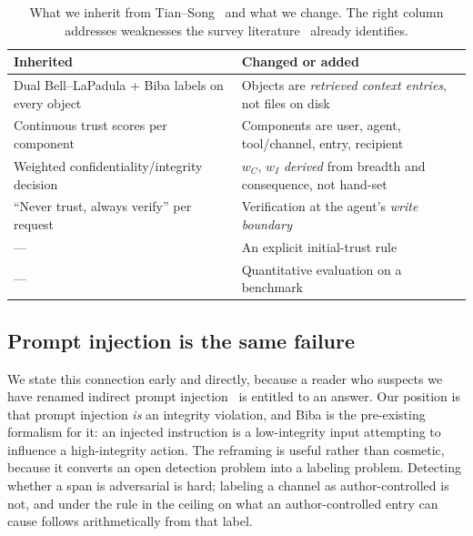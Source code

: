 \documentclass[conference,compsoc]{IEEEtran}
\newcommand{\wC}{\ensuremath{w_C}}
\newcommand{\wI}{\ensuremath{w_I}}
\begin{document}
\begin{table}[t]
\centering
\caption{What we inherit from Tian--Song~\cite{tiansong2021} and what we
change. The right column addresses weaknesses the survey
literature~\cite{he2022zerotrust,sultana2024zerotrust} already identifies.}
\label{tab:tiansong}
\footnotesize
\begin{tabular}{@{}p{}p{}@{}}
\toprule
\textbf{Inherited} & \textbf{Changed or added} \\
\midrule
Dual Bell--LaPadula + Biba labels on every object &
Objects are \emph{retrieved context entries}, not files on disk \\[2pt]
Continuous trust scores per component &
Components are user, agent, tool/channel, entry, recipient \\[2pt]
Weighted confidentiality/integrity decision &
$\wC$, $\wI$ \emph{derived} from breadth and consequence, not hand-set \\[2pt]
``Never trust, always verify'' per request &
Verification at the agent's \emph{write boundary} \\[2pt]
--- &
An explicit initial-trust rule \\[2pt]
--- &
Quantitative evaluation on a benchmark \\
\bottomrule
\end{tabular}
\end{table}

\subsection{Prompt injection is the same failure}
\label{sec:background:injection}

We state this connection early and directly, because a reader who suspects we
have renamed indirect prompt injection~\cite{greshake2023indirect,perez2022ignore}
is entitled to an answer. Our position is that prompt injection \emph{is} an
integrity violation, and Biba is the pre-existing formalism for it: an injected
instruction is a low-integrity input attempting to influence a high-integrity
action. The reframing is useful rather than cosmetic, because it converts an
open detection problem into a labeling problem. Detecting whether a span is
adversarial is hard; labeling a channel as author-controlled is not, and under
the rule in  the ceiling on what an author-controlled
entry can cause follows arithmetically from that label.
\end{document}
